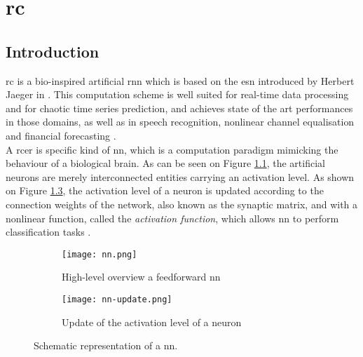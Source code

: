 \chapter{\acrlong{rc}}
\label{rc}

\section{Introduction}


\gls{rc} is a bio-inspired artificial \gls{rnn} which is based on the \gls{esn} introduced by Herbert Jaeger in \cite{Jaeger2004}. This computation scheme is well suited for real-time data processing and for chaotic time series prediction\cite{Jaeger2004, JaegerH.2001Tesa, Lukoeviius2012}, and achieves state of the art performances in those domains, as well as in speech recognition\cite{Verstraeten2006, NIPS2010_4056, Jaeger2007}, nonlinear channel equalisation\cite{Jaeger2004} and financial forecasting \cite{financialTimeSeries}.\\

A \gls{rcer} is specific kind of \gls{nn}, which is a computation paradigm mimicking the behaviour of a biological brain. As can be seen on Figure \ref{nn}, the artificial neurons are merely interconnected entities carrying an activation level. As shown on Figure \ref{nn-update}, the activation level of a neuron is updated according to the connection weights of the network, also known as the synaptic matrix, and with a nonlinear function, called the \textit{activation function}, which allows \gls{nn} to perform classification tasks \cite[p.225]{bishop2006pattern}\cite[p.727]{russell2010artificial}.\\

\begin{figure}[h]
	\centering
	\begin{subfigure}{.5\textwidth}
		\centering
		\texttt{[image: nn.png]}
		\caption{High-level overview a feedforward \gls{nn} \\ \cite[p.228]{bishop2006pattern}}
		\label{nn}
	\end{subfigure}%
	\begin{subfigure}{.5\textwidth}
		\centering
		\texttt{[image: nn-update.png]}
		\caption{Update of the activation level of a neuron \\ \cite[p.728]{russell2010artificial}}
		\label{nn-update}
	\end{subfigure}
	\caption{Schematic representation of a \acrlong{nn}.}
\end{figure}

